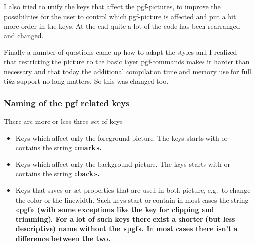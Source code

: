 \documentclass[pagesize,parskip=half-,fontsize=12pt]{scrartcl}
\begin{document}
I also tried to unify the keys that affect the pgf-pictures, to
improve the possibilities for the user to  control which pgf-picture
is affected and put a bit more order in the keys. At the end quite a
lot of the code has been rearranged and changed.

Finally a number of questions came up how to adapt the styles and I realized that restricting the picture to the basic layer pgf-commands makes it harder than necessary and that today the additional compilation time and memory use for full ti\textit{k}z support no long matters. So this was changed too.


\subsubsection{Naming of the pgf related keys}

There are more or less three set of keys

\begin{itemize}
\item Keys which affect only the foreground picture. The keys starts with or contains the
string «\bfseries\ttfamily mark».
\item  Keys which affect only the background picture. The keys starts with or contains the
string «\bfseries\ttfamily back».

\item
Keys that saves or set properties that are used in both picture,
e.g.\ to change the color or the linewidth. Such keys start or
contain in most cases the string  «\bfseries\ttfamily pgf» (with some
exceptions like the key for clipping and trimming). For a lot of such
keys there exist a shorter (but less descriptive) name without the
«\ttfamily pgf». In most cases there isn't a difference between the
two.

\end{itemize}
%
\end{document}
